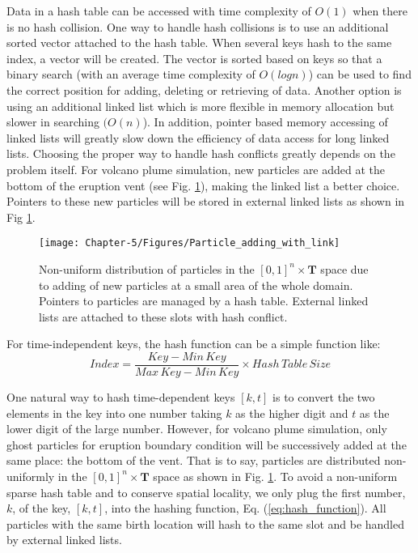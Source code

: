 Data in a hash table can be accessed with time complexity of $O(1)$ when there is no hash collision. One way to handle hash collisions is to use an additional sorted vector attached to the hash table. When several keys hash to the same index, a vector will be created. The vector is sorted based on keys so that a binary search (with an average time complexity of $O(log n)$) can be used to find the correct position for adding, deleting or retrieving of data. Another option is using an additional linked list which is more flexible in memory allocation but slower in searching $(O(n)$). In addition, pointer based memory accessing of linked lists will greatly slow down the efficiency of data access for long linked lists. Choosing the proper way to handle hash conflicts greatly depends on the problem itself. For volcano plume simulation, new particles are added at the bottom of the eruption vent (see Fig. \ref{fig:Particle_adding_with_link}), making the linked list a better choice. Pointers to these new particles will be stored in external linked lists as shown in Fig \ref{fig:Particle_adding_with_link}.
\begin{figure}
\centering
{\texttt{[image: Chapter-5/Figures/Particle\_adding\_with\_link]}}
{\caption{Non-uniform distribution of particles in the $[0,1]^n \times \textbf{T}$ space due to adding of new particles at a small area of the whole domain. Pointers to particles are managed by a hash table. External linked lists are attached to these slots with hash conflict.}
\label{fig:Particle_adding_with_link}}
\end{figure}

For time-independent keys, the hash function can be a simple function like:
\begin{equation}
Index= \frac{Key - Min\,Key}{Max\,Key - Min\,Key} 
\times Hash\,Table\,Size 
\label{eq:hash_function}
\end{equation}

One natural way to hash time-dependent keys $[k,t]$ is to convert the two elements in the key into one number taking $k$ as the higher digit and $t$ as the lower digit of the large number. However, for volcano plume simulation, only ghost particles for eruption boundary condition will be successively added at the same place: the bottom of the vent. That is to say, particles are distributed non-uniformly in the $[0,1]^n \times \textbf{T}$ space as shown in Fig. \ref{fig:Particle_adding_with_link}. To avoid a non-uniform sparse hash table and to conserve spatial locality, we only plug the first number, $k$, of the key, $[k,t]$, into the hashing function, Eq. (\ref{eq:hash_function}). All particles with the same birth location will hash to the same slot and be handled by external linked lists.

